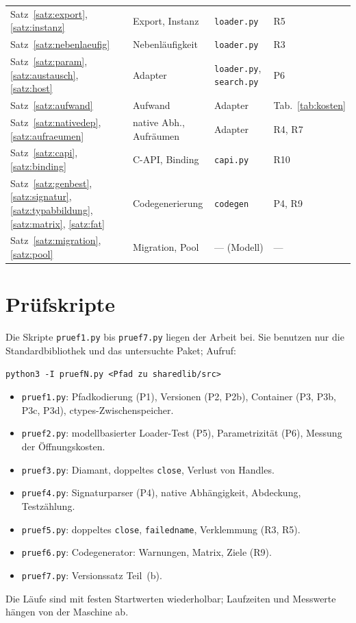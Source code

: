 \documentclass[a4paper,12pt,twoside]{report}
\DeclareRobustCommand{\_}{\ifmmode\mbox{\textunderscore}\else\textunderscore\allowbreak{}\fi}
\theoremstyle{definition}
\begin{document}
\begin{longtable}{@{}L{4.6cm}L{3.0cm}L{4.0cm}L{2.8cm}@{}}
	Satz~\ref{satz:export}, \ref{satz:instanz} & Export, Instanz & \texttt{loader.py} & R5 \\
	Satz~\ref{satz:nebenlaeufig} & Nebenläufigkeit & \texttt{loader.py} & R3 \\
	Satz~\ref{satz:param}, \ref{satz:austausch}, \ref{satz:host} & Adapter & \texttt{loader.py}, \texttt{search.py} & P6 \\
	Satz~\ref{satz:aufwand} & Aufwand & Adapter & Tab.~\ref{tab:kosten} \\
	Satz~\ref{satz:nativedep}, \ref{satz:aufraeumen} & native Abh., Aufräumen & Adapter & R4, R7 \\
	Satz~\ref{satz:capi}, \ref{satz:binding} & C-API, Binding & \texttt{capi.py} & R10 \\
	Satz~\ref{satz:genbest}, \ref{satz:signatur}, \ref{satz:typabbildung}, \ref{satz:matrix}, \ref{satz:fat} & Codegenerierung & \texttt{codegen} & P4, R9 \\
	Satz~\ref{satz:migration}, \ref{satz:pool} & Migration, Pool & --- (Modell) & --- \\
	\bottomrule
\end{longtable}

\chapter{Prüfskripte}
\label{app:skripte}

Die Skripte \texttt{pruef1.py} bis \texttt{pruef7.py} liegen der Arbeit bei. Sie benutzen nur die Standardbibliothek und das untersuchte Paket; Aufruf:
\begin{lstlisting}[language={},numbers=none]
python3 -I pruefN.py <Pfad zu sharedlib/src>
\end{lstlisting}
\begin{itemize}
	\item \texttt{pruef1.py}: Pfadkodierung (P1), Versionen (P2, P2b), Container (P3, P3b, P3c, P3d), ctypes-Zwischenspeicher.
	\item \texttt{pruef2.py}: modellbasierter Loader-Test (P5), Parametrizität (P6), Messung der Öffnungskosten.
	\item \texttt{pruef3.py}: Diamant, doppeltes \texttt{close}, Verlust von Handles.
	\item \texttt{pruef4.py}: Signaturparser (P4), native Abhängigkeit, Abdeckung, Testzählung.
	\item \texttt{pruef5.py}: doppeltes \texttt{close}, \texttt{failed\_name}, Verklemmung (R3, R5).
	\item \texttt{pruef6.py}: Codegenerator: Warnungen, Matrix, Ziele (R9).
	\item \texttt{pruef7.py}: Versionssatz Teil~(b).
\end{itemize}
Die Läufe sind mit festen Startwerten wiederholbar; Laufzeiten und Messwerte hängen von der Maschine ab.
\end{document}
